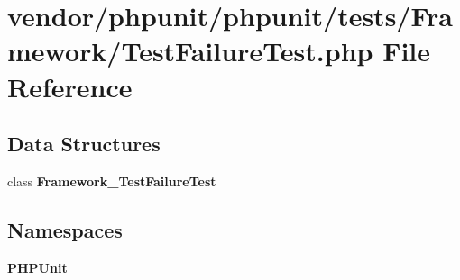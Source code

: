 \section{vendor/phpunit/phpunit/tests/\+Framework/\+Test\+Failure\+Test.php File Reference}
\label{_test_failure_test_8php}
\subsection*{Data Structures}
\begin{DoxyCompactItemize}
\item 
class {\bf Framework\+\_\+\+Test\+Failure\+Test}
\end{DoxyCompactItemize}
\subsection*{Namespaces}
\begin{DoxyCompactItemize}
\item 
 {\bf P\+H\+P\+Unit}
\end{DoxyCompactItemize}
